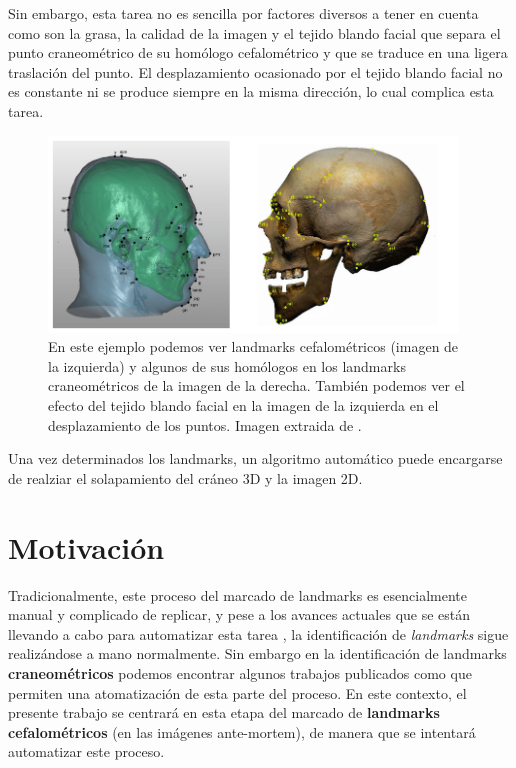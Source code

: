 \medskip

\noindent Sin embargo, esta tarea no es sencilla por factores diversos a tener en cuenta como son la grasa, la calidad de la imagen y el tejido blando facial que separa el punto craneométrico de su homólogo cefalométrico y que se traduce en una ligera traslación del punto. El desplazamiento ocasionado por el tejido blando facial no es constante ni se produce siempre en la misma dirección, lo cual complica esta tarea. 

\begin{figure}[!h]
    \centering
    \includegraphics[width=0.97\textwidth]{img/marcado_landmarks.png}
    \caption{En este ejemplo podemos ver landmarks cefalométricos (imagen de la izquierda) y algunos de sus homólogos en los landmarks craneométricos de la imagen de la derecha. También podemos ver el efecto del tejido blando facial en la imagen de la izquierda en el desplazamiento de los puntos. Imagen extraida de \cite{damas2020handbook}.}
\end{figure}

\medskip Una vez determinados los landmarks, un algoritmo automático puede encargarse de realziar el solapamiento del cráneo 3D y la imagen 2D.

\section{Motivación}

Tradicionalmente, este proceso del marcado de landmarks es esencialmente manual y complicado de replicar, y pese a los avances actuales que se están llevando a cabo para automatizar esta tarea \cite{Huete2015PastPA}, la identificación de \textit{landmarks} sigue realizándose a mano normalmente. Sin embargo en la identificación de landmarks \textbf{craneométricos} podemos encontrar algunos trabajos publicados como \cite{bermejo2021automatic} que permiten una atomatización de esta parte del proceso. En este contexto, el presente trabajo se centrará en esta etapa del marcado de \textbf{landmarks cefalométricos} (en las imágenes ante-mortem), de manera que se intentará automatizar este proceso.

